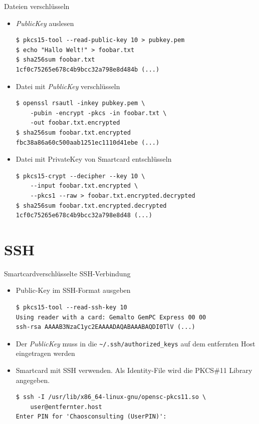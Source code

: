 \documentclass{beamer}
\begin{document}
\begin{frame}[fragile]{Dateien verschlüsseln}
\begin{minipage}[t][\textheight][t]{\linewidth}
\begin{itemize}
  \item \emph{PublicKey} auslesen
\begin{lstlisting}
$ pkcs15-tool --read-public-key 10 > pubkey.pem
$ echo "Hallo Welt!" > foobar.txt
$ sha256sum foobar.txt
1cf0c75265e678c4b9bcc32a798e8d484b (...)
\end{lstlisting}
  \item Datei mit \emph{PublicKey} verschlüsseln
\begin{lstlisting}
$ openssl rsautl -inkey pubkey.pem \
    -pubin -encrypt -pkcs -in foobar.txt \
    -out foobar.txt.encrypted
$ sha256sum foobar.txt.encrypted
fbc38a86a60c500aab1251ec1110d41ebe (...)
\end{lstlisting}
  \item Datei mit {PrivateKey} von Smartcard entschlüsseln
\begin{lstlisting}
$ pkcs15-crypt --decipher --key 10 \
    --input foobar.txt.encrypted \
    --pkcs1 --raw > foobar.txt.encrypted.decrypted
$ sha256sum foobar.txt.encrypted.decrypted
1cf0c75265e678c4b9bcc32a798e8d48 (...)
\end{lstlisting}
\end{itemize}
\end{minipage}
\end{frame}

\section{SSH}

\begin{frame}[fragile]{Smartcardverschlüsselte SSH-Verbindung}
\begin{minipage}[t][\textheight][t]{\linewidth}
\begin{itemize}
	\item Public-Key im SSH-Format ausgeben
	\begin{lstlisting}
$ pkcs15-tool --read-ssh-key 10
Using reader with a card: Gemalto GemPC Express 00 00
ssh-rsa AAAAB3NzaC1yc2EAAAADAQABAAABAQDI0TlV (...)
	\end{lstlisting}
	\item Der \emph{PublicKey} muss in die \lstinline|~/.ssh/authorized_keys|
	auf dem entfernten Host eingetragen werden
	\item Smartcard mit SSH verwenden. Als Identity-File wird die PKCS\#11 Library
	angegeben.
	\begin{lstlisting}
$ ssh -I /usr/lib/x86_64-linux-gnu/opensc-pkcs11.so \
    user@entfernter.host 
Enter PIN for 'Chaosconsulting (UserPIN)': 
	\end{lstlisting}
\end{itemize}
\end{minipage}
\end{frame}
\end{document}
